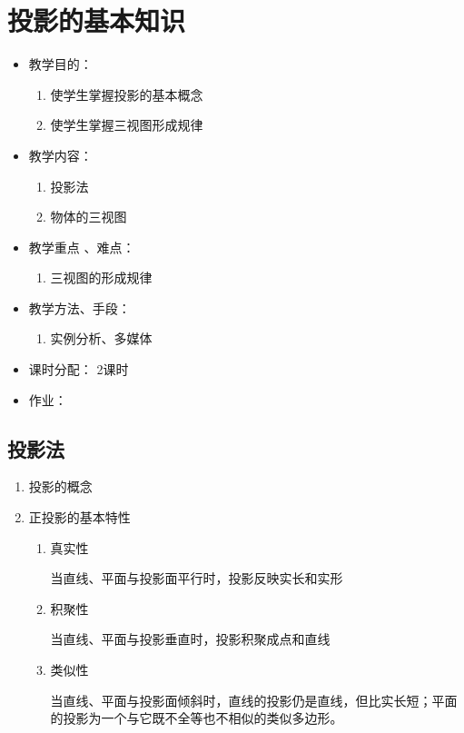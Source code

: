 \chapter{投影的基本知识}
\begin{itemize}
\item 教学目的：
\begin{enumerate}
\item 使学生掌握投影的基本概念
\item 使学生掌握三视图形成规律
\end{enumerate}
\item 教学内容：
\begin{enumerate}
\item 投影法
\item 物体的三视图
\end{enumerate}
\item 教学重点 、难点：
\begin{enumerate}
\item 三视图的形成规律
\end{enumerate}
\item 教学方法、手段：
\begin{enumerate}
\item 实例分析、多媒体
\end{enumerate}
\item 课时分配：
2课时
\item 作业：
\end{itemize}
\section{投影法}
\begin{enumerate}
\item 投影的概念
\item 正投影的基本特性
\begin{enumerate}
\item 真实性

当直线、平面与投影面平行时，投影反映实长和实形
\item 积聚性

当直线、平面与投影垂直时，投影积聚成点和直线
\item 类似性

当直线、平面与投影面倾斜时，直线的投影仍是直线，但比实长短；平面的投影为一个与它既不全等也不相似的类似多边形。
\end{enumerate}
\end{enumerate}

